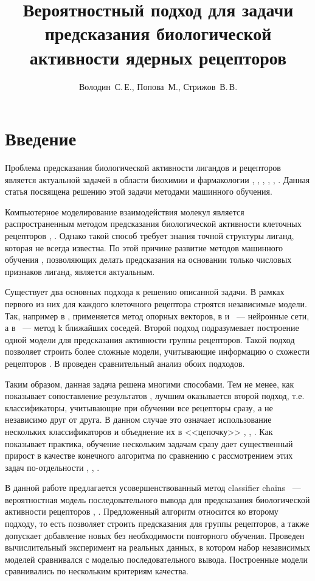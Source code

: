 \documentclass[12pt,twoside]{article}
\title
    [Предсказание биологической активности ядерных рецепторов] %
    {Вероятностный подход для задачи предсказания биологической активности ядерных рецепторов}
\author
    [Володин~С.\,Е.] %
    {Володин~С.\,Е., Попова~М., Стрижов~В.\,В.} %
    [Володин~С.\,Е., Попова~М., Стрижов~В.\,В.] %
\begin{document}
\maketitle
\section{Введение}
Проблема предсказания биологической активности лигандов и рецепторов является актуальной задачей в области биохимии и фармакологии \cite{hornak}, \cite{Myint2012}, \cite{Myint2015}, \cite{vinay2008}, \cite{Zhengjun5ht1a}, \cite{laurent2008}. Данная статья посвящена решению этой задачи методами машинного обучения.

Компьютерное моделирование взаимодействия молекул является распространенным методом предсказания биологической активности клеточных рецепторов \cite{vinay2008}, \cite{hornak}. Однако такой способ требует знания точной структуры лиганд, которая не всегда известна. По этой причине развитие методов машинного обучения \cite{peter1998}, позволяющих делать предсказания на основании только числовых признаков лиганд, является актуальным.

Существует два основных подхода к решению описанной задачи. В рамках первого из них для каждого клеточного рецептора строятся независимые модели. Так, например в \cite{svm}, \cite{Zhengjun5ht1a} применяется метод опорных векторов, в \cite{Myint2012} и \cite{Myint2015}~--- нейронные сети, а в \cite{scott2006}~--- метод k ближайших соседей. Второй подход подразумевает построение одной модели для предсказания активности группы рецепторов. Такой подход позволяет строить более сложные модели, учитывающие информацию о схожести рецепторов \cite{laurent2008}. В \cite{popova1} проведен сравнительный анализ обоих подходов.

Таким образом, данная задача решена многими способами. Тем не менее, как показывает сопоставление результатов \cite{popova1}, лучшим оказывается второй подход, т.е. классификаторы, учитывающие при обучении все рецепторы сразу, а не независимо друг от друга. В данном случае это означает использование нескольких классификаторов и объеднение их в <<цепочку>> \cite{elena}, \cite{weiweicc}, \cite{jesse}. Как показывает практика, обучение нескольким задачам сразу дает существенный прирост в качестве конечного алгоритма по сравнению с рассмотрением этих задач по-отдельности \cite{weiwei2010}, \cite{maxime2015}, \cite{jesse}.

В данной работе предлагается усовершенствованный метод classifier chains \cite{jesse}~--- вероятностная модель последовательного вывода для предсказания биологической активности рецепторов \cite{enrique}, \cite{weiwei2010}. Предложенный алгоритм относится ко второму подходу, то есть позволяет строить предсказания для группы рецепторов, а также допускает добавление новых без необходимости повторного обучения. Проведен вычислительный эксперимент на реальных данных, в котором набор независимых моделей сравнивался с моделью последовательного вывода. Построенные модели сравнивались по нескольким критериям качества.
\end{document}
